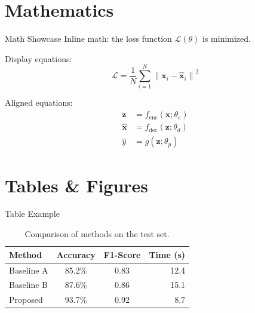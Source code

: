 \documentclass[aspectratio=169]{beamer}
\begin{document}
\section{Mathematics}

\begin{frame}{Math Showcase}
  Inline math: the loss function $\mathcal{L}(\theta)$ is minimized.

  \vspace{4mm}
  Display equations:
  \begin{equation}
    \mathcal{L} = \frac{1}{N} \sum_{i=1}^{N} \left\| \mathbf{x}_i - \hat{\mathbf{x}}_i \right\|^2
  \end{equation}

  \vspace{2mm}
  Aligned equations:
  \begin{align}
    \mathbf{z} &= f_{\text{enc}}(\mathbf{x}; \theta_e) \\
    \hat{\mathbf{x}} &= f_{\text{dec}}(\mathbf{z}; \theta_d) \\
    \hat{y} &= g(\mathbf{z}; \theta_p)
  \end{align}
\end{frame}

\section{Tables \& Figures}

\begin{frame}{Table Example}
  \begin{table}
    \centering
    \begin{tabular}{lccr}
      \toprule
      \textbf{Method} & \textbf{Accuracy} & \textbf{F1-Score} & \textbf{Time (s)} \\
      \midrule
      Baseline A       & 85.2\%            & 0.83              & 12.4 \\
      Baseline B       & 87.6\%            & 0.86              & 15.1 \\
      \alert{Proposed} & \alert{93.7\%}    & \alert{0.92}      & \alert{8.7} \\
      \bottomrule
    \end{tabular}
    \caption{Comparison of methods on the test set.}
  \end{table}
\end{frame}
\end{document}
